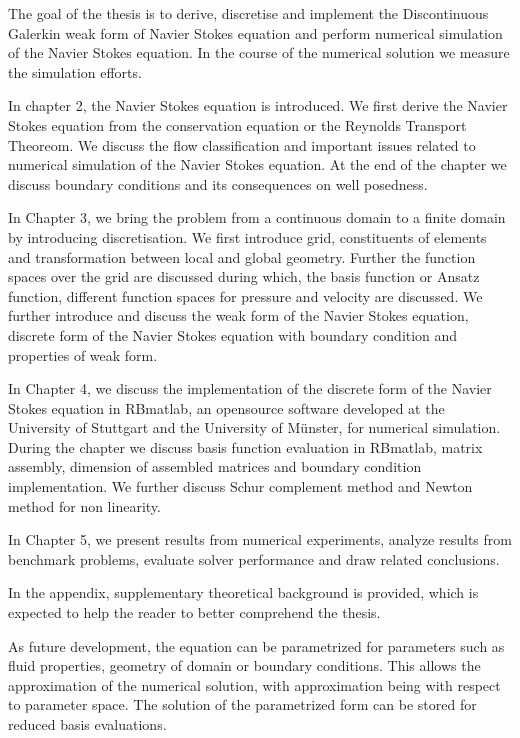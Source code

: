 \documentclass[a4paper,12pt]{book}
\begin{document}
The goal of the thesis is to derive, discretise and implement the Discontinuous Galerkin weak form of Navier Stokes equation and perform numerical simulation of the Navier Stokes equation. In the course of the numerical solution we measure the simulation efforts.

In chapter 2, the Navier Stokes equation is introduced. We first derive the Navier Stokes equation from the conservation equation or the Reynolds Transport Theoreom. We discuss the flow classification and important issues related to numerical simulation of the Navier Stokes equation. At the end of the chapter we discuss boundary conditions and its consequences on well posedness.

In Chapter 3, we bring the problem from a continuous domain to a finite domain by introducing discretisation. We first introduce grid, constituents of elements and transformation between local and global geometry. Further the function spaces over the grid are discussed during which, the basis function or Ansatz function, different function spaces for pressure and velocity are discussed. We further introduce and discuss the weak form of the Navier Stokes equation, discrete form of the Navier Stokes equation with boundary condition and properties of weak form.

In Chapter 4, we discuss the implementation of the discrete form of the Navier Stokes equation in RBmatlab, an opensource software developed at the University of Stuttgart and the University of M\"unster, for numerical simulation. During the chapter we discuss basis function evaluation in RBmatlab, matrix assembly, dimension of assembled matrices and boundary condition implementation. We further discuss Schur complement method and Newton method for non linearity.

In Chapter 5, we present results from numerical experiments, analyze results from benchmark problems, evaluate solver performance and draw related conclusions.

In the appendix, supplementary theoretical background is provided, which is expected to help the reader to better comprehend the thesis.

As future development, the equation can be parametrized for parameters such as fluid properties, geometry of domain or boundary conditions. This allows the approximation of the numerical solution, with approximation being with respect to parameter space. The solution of the parametrized form can be stored for reduced basis evaluations.
\end{document}
